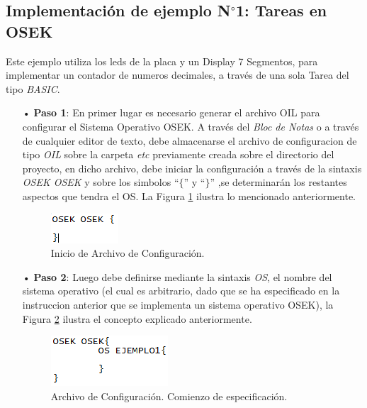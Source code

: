 \documentclass[12pt,letterpaper]{article}
\begin{document}
\subsection{Implementación de ejemplo N$^{\circ}$1: Tareas en OSEK}\label{sec:tareasOSEK}
Este ejemplo utiliza los leds de la placa y un Display 7 Segmentos, para implementar un contador de numeros decimales, a través de una sola Tarea del tipo \textit{BASIC}.
\begin{enumerate}

\item[•]\textbf{Paso 1}: En primer lugar es necesario generar el archivo OIL para configurar el Sistema Operativo OSEK. A través del \textit{Bloc de Notas} o a través de cualquier editor de texto, debe almacenarse el archivo de configuracion de tipo \textit{OIL} sobre la carpeta \textit{etc} previamente creada sobre el directorio del proyecto, en dicho archivo, debe iniciar la configuración a través de la sintaxis \textit{OSEK OSEK} y sobre los simbolos ``$\lbrace$'' y ``$\rbrace$'' ,se determinarán los restantes aspectos que tendra el OS. La Figura \ref{Fig35} ilustra lo mencionado anteriormente.
\begin{figure}[H]
\centering
\includegraphics[width=5 cm]{figuras/f18.png}
\caption{Inicio de Archivo de Configuración.}
\label{Fig35}
\end{figure}
\item[•]\textbf{Paso 2}: Luego debe definirse mediante la sintaxis \textit{OS}, el nombre del sistema operativo (el cual es arbitrario, dado que se ha especificado en la instruccion anterior que se implementa un sistema operativo OSEK), la Figura \ref{Fig36} ilustra el concepto explicado anteriormente.
\begin{figure}[H]
\centering
\includegraphics[width=5 cm]{figuras/f19.png}
\caption{Archivo de Configuración. Comienzo de especificación.}
\label{Fig36}
\end{figure}


\end{enumerate}
\end{document}

